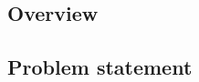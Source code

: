 \documentclass[12pt]{article}
\begin{document}
\subsection{Overview }
\begin{comment}
The Pradhan Mantri Fasal Bima Yojana (PMFBY) is a flagship agricultural insurance scheme introduced by the Government of India 
to protect farmers from crop losses due to natural calamities. While the scheme has positively impacted agricultural risk management, several challenges remain, 
particularly in understanding and optimizing farmers' contributions. With participation varying widely across regions and crop types, policymakers face difficulties 
in ensuring balanced subsidy allocation and equitable access for farmers. This research leverages data-driven methods to explore patterns in farmers' contributions 
and to provide actionable insights for improving the scheme's efficiency.
\vspace{5pt}
By analyzing historical data on crop insurance coverage, the study aims to uncover key trends and dependencies, which will aid in designing policies that better align
 with farmers' financial capacity and agricultural risk profiles. Through the development of a predictive model, this research seeks to bridge the gap between data insights and practical policy-making for PMFBY.
\end{comment}

\subsection{Problem statement}
\begin{comment}
This project aims to predict the farmers' contribution to PMFBY using historical data on crop insurance coverage. The outcome of this analysis will provide insights into 
patterns in farmers' contributions and help optimize subsidy allocation policies. 
\end{comment}
\end{document}
